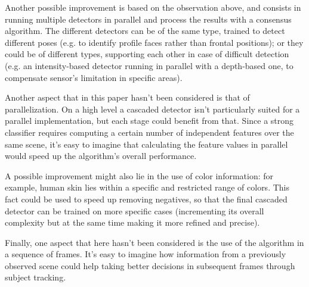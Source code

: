 \documentclass[a4paper,11pt,titlepage]{article}
\begin{document}
Another possible improvement is based on the observation above, and consists in
running multiple detectors in parallel and process the results with a consensus
algorithm. The different detectors can be of the same type, trained to detect
different poses (e.g. to identify profile faces rather than frontal positions);
or they could be of different types, supporting each other in case of difficult
detection (e.g. an intensity-based detector running in parallel with a
depth-based one, to compensate sensor's limitation in specific areas).

Another aspect that in this paper hasn't been considered is that of
parallelization. On a high level a cascaded detector isn't particularly suited
for a parallel implementation, but each stage could benefit from that. Since a
strong classifier requires computing a certain number of independent features
over the same scene, it's easy to imagine that calculating the feature values in
parallel would speed up the algorithm's overall performance.

A possible improvement might also lie in the use of color information: for
example, human skin lies within a specific and restricted range of colors. This
fact could be used to speed up removing negatives, so that the final cascaded
detector can be trained on more specific cases (incrementing its overall
complexity but at the same time making it more refined and precise).

Finally, one aspect that here hasn't been considered is the use of the algorithm
in a sequence of frames. It's easy to imagine how information from a
previously observed scene could help taking better decisions in subsequent
frames through subject tracking.



\end{document}
